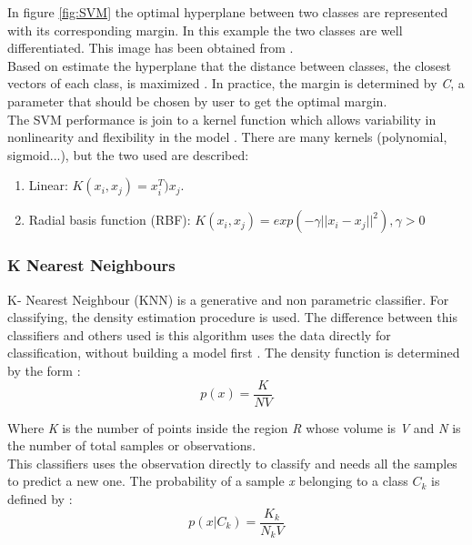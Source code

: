 In figure \ref{fig:SVM} the optimal hyperplane between two classes are represented with its corresponding margin. In this example the two classes are well differentiated. This image has been obtained from \cite{SVMimage}.\\

Based on estimate the hyperplane that the distance between classes, the closest vectors of each class, is maximized \cite{SVM1, MachineLearning}. In practice, the margin is determined by \textit{C}, a parameter that should be chosen by user to get the optimal margin.\\

The SVM performance is join to a kernel function which allows variability in nonlinearity and flexibility in the model \cite{ClassifiersReview, practicalguideSVM}. There are many kernels (polynomial, sigmoid...), but the two used are described:

\begin{enumerate}
\item Linear: $ K(x_{i},x_{j}) = x_i^T)x_j$.
\item Radial basis function (RBF): $K(x_{i},x_{j}) = exp(-\gamma||x_i-x_j||^2), \gamma>0$
\end{enumerate}


\subsubsection{K Nearest Neighbours}
K- Nearest Neighbour (KNN) is a generative and non parametric classifier. For classifying, the density estimation procedure is used. The difference between this classifiers and others used is this algorithm uses the data directly for classification, without building a model first \cite{ClassifiersReview}. The density function is determined by the form \cite{MachineLearning}:
\begin{equation}
p(x) = \frac{K}{N V}
\end{equation}

Where \textit{K} is the number of points inside the region \textit{R} whose volume is \textit{V} and \textit{N} is the number of total samples or observations.\\

This classifiers uses the observation directly to classify and needs all the samples to predict a new one. The probability of a sample \textit{x} belonging to a class \textit{$C_k$} is defined by \cite{MachineLearning}:
\begin{equation}
p(x|C_k) = \frac{K_k}{N_k V}
\end{equation}

